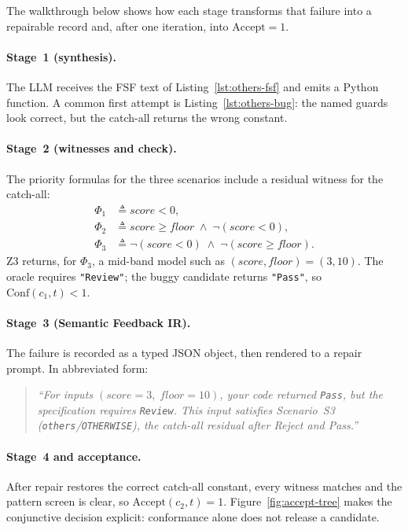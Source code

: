 The walkthrough below shows how each stage transforms that failure into a
repairable record and, after one iteration, into $\mathrm{Accept}=1$.

\paragraph{Stage~1 (synthesis).}
The LLM receives the FSF text of Listing~\ref{lst:others-fsf} and emits a
Python function.
A common first attempt is Listing~\ref{lst:others-bug}: the named guards look
correct, but the catch-all returns the wrong constant.

\paragraph{Stage~2 (witnesses and check).}
The priority formulas for the three scenarios include a residual witness for
the catch-all:
\begin{align}
  \Phi_1 &\triangleq \mathit{score}<0, \\
  \Phi_2 &\triangleq \mathit{score}\ge\mathit{floor}
           \;\land\; \neg(\mathit{score}<0), \\
  \Phi_3 &\triangleq \neg(\mathit{score}<0)
           \;\land\; \neg(\mathit{score}\ge\mathit{floor}).
  \label{eq:phi-catchall}
\end{align}
Z3 returns, for $\Phi_3$, a mid-band model such as $(\mathit{score},\mathit{floor})=(3,10)$.
The oracle requires \texttt{"Review"}; the buggy candidate returns
\texttt{"Pass"}, so $\mathrm{Conf}(c_1,t)<1$.

\paragraph{Stage~3 (Semantic Feedback IR).}
The failure is recorded as a typed JSON object, then rendered to a repair
prompt.  In abbreviated form:
\begin{quote}
\textit{``For inputs $(\mathit{score}{=}3,\;\mathit{floor}{=}10)$,
your code returned \texttt{Pass}, but the specification requires
\texttt{Review}.
This input satisfies Scenario~S3 (\texttt{others}/\texttt{OTHERWISE}), the
catch-all residual after Reject and Pass.''}
\end{quote}

\paragraph{Stage~4 and acceptance.}
After repair restores the correct catch-all constant, every witness matches and
the pattern screen is clear, so $\mathrm{Accept}(c_2,t)=1$.
Figure~\ref{fig:accept-tree} makes the conjunctive decision explicit:
conformance alone does not release a candidate.


